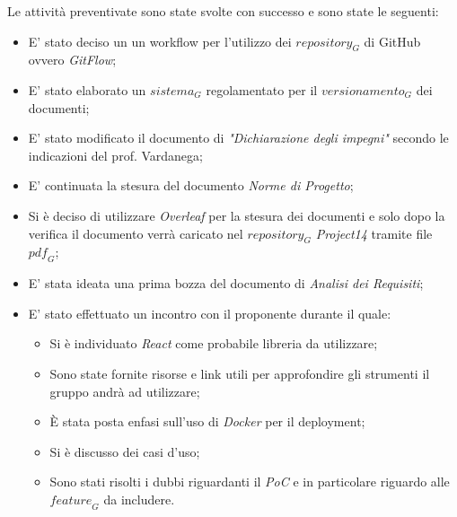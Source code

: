 Le attività preventivate sono state svolte con successo e sono state le seguenti:
\begin{itemize}
    \item E' stato deciso un un workflow per l'utilizzo dei $\textit{repository}_G$ di GitHub ovvero \emph{GitFlow};
    \item E' stato elaborato un $\textit{sistema}_G$ regolamentato per il $\textit{versionamento}_G$ dei documenti;
    \item E' stato modificato il documento di \emph{"Dichiarazione degli impegni"} secondo le indicazioni del prof. Vardanega;
    \item E' continuata la stesura del documento \emph{Norme di Progetto};
    \item Si è deciso di utilizzare \emph{Overleaf} per la stesura dei documenti e solo dopo la verifica il documento verrà caricato nel $\textit{repository}_G$ \emph{Project14} tramite file $\textit{pdf}_G$;
    \item E' stata ideata una prima bozza del documento di \emph{Analisi dei Requisiti};
    \item E' stato effettuato un incontro con il proponente durante il quale:
    \begin{itemize}
        \item Si è individuato \emph{React} come probabile libreria da utilizzare;
        \item Sono state fornite risorse e link utili per approfondire gli strumenti il gruppo andrà ad utilizzare;
        \item È stata posta enfasi sull'uso di \emph{Docker} per il deployment;
        \item Si è discusso dei casi d'uso;
        \item Sono stati risolti i dubbi riguardanti il \emph{PoC} e in particolare riguardo alle $\textit{feature}_G$ da includere.
    \end{itemize}
\end{itemize}
